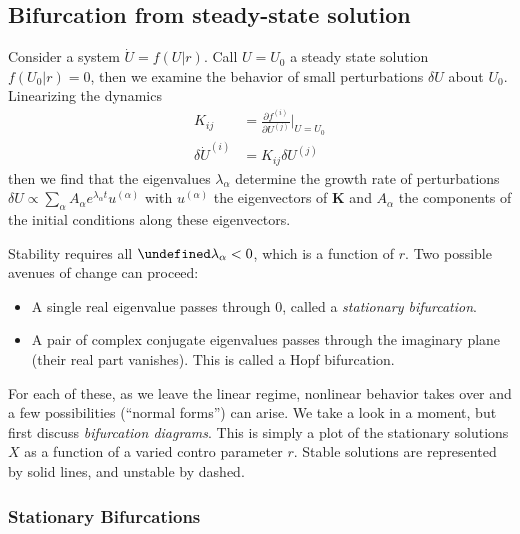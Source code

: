 \documentclass[12pt]{article}
\newcommand{\pd}[2]{\frac{\partial#1}{\partial#2}}
\let\Re\undefined
\DeclareMathOperator{\Re}{Re}
\begin{document}
\subsection{Bifurcation from steady-state solution}

Consider a system $\dot{U} = f(U|r)$. Call $U = U_0$ a steady state solution
$f(U_0|r) = 0$, then we examine the behavior of small perturbations $\delta U$
about $U_0$. Linearizing the dynamics
\begin{align}
    K_{ij} &= \pd{f^{(i)}}{U^{(j)}}\Bigg|_{U=U_0}\\
    \delta\dot{U}^{(i)} &= K_{ij} \delta U^{(j)}
\end{align}
then we find that the eigenvalues $\lambda_\alpha$ determine the growth rate of
perturbations
$\delta U \propto \sum\limits_{\alpha}^{}A_\alpha
e^{\lambda_\alpha t}u^{(\alpha)}$
with $u^{(\alpha)}$ the eigenvectors of $\mathbf{K}$ and $A_\alpha$ the
components of the initial conditions along these eigenvectors.

Stability requires all $\Re \lambda_\alpha < 0$, which is a function of $r$. Two
possible avenues of change can proceed:
\begin{itemize}
    \item A single real eigenvalue passes through $0$, called a \emph{stationary
        bifurcation}.
    \item A pair of complex conjugate eigenvalues passes through the imaginary
        plane (their real part vanishes). This is called a Hopf bifurcation.
\end{itemize}

For each of these, as we leave the linear regime, nonlinear behavior takes over
and a few possibilities (``normal forms'') can arise. We take a look in a
moment, but first discuss \emph{bifurcation diagrams}. This is simply a plot of
the stationary solutions $X$ as a function of a varied contro parameter $r$.
Stable solutions are represented by solid lines, and unstable by dashed.

\subsubsection{Stationary Bifurcations}
\end{document}
